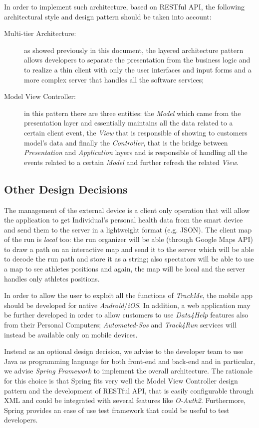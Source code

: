 \documentclass[a4paper]{article}
\begin{document}
    In order to implement such architecture, based on RESTful API, the following architectural style and design pattern should be taken into account:
    \begin{description}
        \item[Multi-tier Architecture:] as showed previously in this document, the layered architecture pattern allows developers to separate the presentation from the business logic and to realize a thin client with only the user interfaces and input forms and a more complex server that handles all the software services;
        \item[Model View Controller:] in this pattern there are three entities: the \textit{Model} which came from the presentation layer and essentially maintains all the data related to a certain client event, the \textit{View} that is responsible of showing to customers model's data and finally the \textit{Controller}, that is the bridge between \textit{Presentation} and \textit{Application} layers and is responsible of handling all the events related to a certain \textit{Model} and further refresh the related \textit{View}.
    \end{description}

\subsection{Other Design Decisions}
The management of the external device is a client only operation that will allow the application to get Individual's personal health data from the smart device and send them to the server in a lightweight format (e.g. JSON). The client map of the run is \textit{local} too: the run organizer will be able (through Google Maps API) to draw a path on an interactive map and send it to the server which will be able to decode the run path and store it as a string; also spectators will be able to use a map to see athletes positions and again, the map will be local and the server handles only athletes positions.

In order to allow the user to exploit all the functions of \textit{TrackMe}, the mobile app should be developed for native \textit{Android}/\textit{iOS}. In addition, a web application may be further developed in order to allow customers to use \textit{Data4Help} features also from their Personal Computers; \textit{Automated-Sos} and \textit{Track4Run} services will instead be available only on mobile devices.

Instead as an optional design decision, we advise to the developer team to use Java as programming language for both front-end and back-end and in particular, we advise \textit{Spring Framework} to implement the overall architecture. The rationale for this choice is that Spring fits very well the Model View Controller design pattern and the development of RESTful API, that is easily configurable through XML and could be integrated with several features like \textit{O-Auth2}. Furthermore, Spring provides an ease of use test framework that could be useful to test developers.
\end{document}
